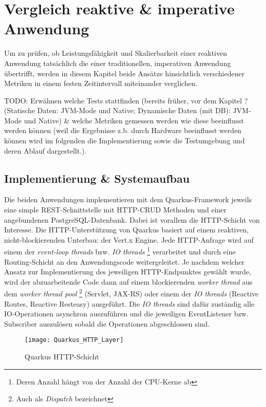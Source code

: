 \section {Vergleich reaktive \& imperative Anwendung}
\label{section:vergleich_reaktiv_imperativ}
Um zu prüfen, ob Leistungsfähigkeit und Skalierbarkeit einer reaktiven Anwendung tatsächlich die einer traditionellen, imperativen Anwendung
übertrifft, werden in diesem Kapitel beide Ansätze hinsichtlich verschiedener Metriken in einem festen Zeitintervall miteinander verglichen.

TODO: Erwähnen welche Tests stattfinden (bereits früher, vor dem Kapitel ? 
(Statische Daten: JVM-Mode und Native; Dynamische Daten (mit DB): JVM-Mode und Native)
\& welche Metriken gemessen werden wie diese beeinflusst werden können (weil die Ergebnisse z.b. durch Hardware beeinflusst werden können
wird im folgenden die Implementierung sowie die Testumgebung und deren Ablauf dargestellt.).

\subsection{Implementierung \& Systemaufbau}
\label{section:implementierung}
Die beiden Anwendungen implementieren mit dem Quarkus-Framework jeweils eine simple REST-Schnittstelle mit HTTP-CRUD Methoden
und einer angebundenen PostgreSQL-Datenbank.
Dabei ist vorallem die HTTP-Schicht von Interesse. Die HTTP-Unterstützung von Quarkus basiert auf einem reaktiven, nicht-blockierenden
Unterbau: der Vert.x Engine.
Jede HTTP-Anfrage wird auf einem der \textit{event-loop threads} bzw. \textit{IO threads}
\footnote{Deren Anzahl hängt von der Anzahl der CPU-Kerne ab}
verarbeitet und durch eine Routing-Schicht an den Anwendungscode weitergeleitet.
Je nachdem welcher Ansatz zur Implementierung des jeweiligen HTTP-Endpunktes gewählt wurde,
wird der abzuarbeitende Code dann auf einem blockierenden \textit{worker thread} aus dem \textit{worker thread pool}
\footnote{Auch als \textit{Dispatch} bezeichnet} (Servlet, JAX-RS) oder einem der
\textit{IO threads} (Reactive Routes, Reactive Resteasy) ausgeführt.
Die \textit{IO threads} sind dafür zuständig alle IO-Operationen asynchron auszuführen und die jeweiligen EventListener bzw. Subscriber 
auszulösen sobald die Operationen abgeschlossen sind.
\newpage
\begin{figure}[h!]
    \centering
    \texttt{[image: Quarkus\_HTTP\_Layer]}
    \caption{Quarkus HTTP-Schicht \cite{QuarkusReactiveRoutes}}
\end{figure}

